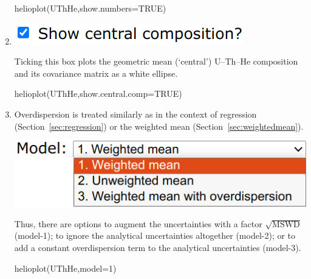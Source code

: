 \begin{refsection}
\begin{enumerate}
\begin{console}
helioplot(UThHe,show.numbers=TRUE)
\end{console}

\item\noindent\begin{minipage}[t]{.32\linewidth}
\strut\vspace*{-\baselineskip}\newline
\includegraphics[width=\linewidth]{../figures/UThHeCentralComposition.png}
\end{minipage}
\begin{minipage}[t]{.68\linewidth}
Ticking this box plots the geometric mean (`central') U--Th--He
composition and its covariance matrix as a white ellipse.
\end{minipage}

\begin{console}
helioplot(UThHe,show.central.comp=TRUE)
\end{console}

\item Overdispersion is treated similarly as in the context of
  regression (Section~\ref{sec:regression}) or the weighted mean
  (Section~\ref{sec:weightedmean}).

\noindent\begin{minipage}[t]{.45\linewidth}
\strut\vspace*{-\baselineskip}\newline
\includegraphics[width=\linewidth]{../figures/UThHeCentralAgeModels.png}
\end{minipage}
\begin{minipage}[t]{.55\linewidth}
Thus, there are options to augment the uncertainties with a factor
$\sqrt{\mbox{MSWD}}$ (model-1); to ignore the analytical uncertainties
altogether (model-2); or to add a constant overdispersion term to the
analytical uncertainties (model-3).
\end{minipage}

\begin{console}
helioplot(UThHe,model=1)
\end{console}


\end{enumerate}
\end{refsection}
